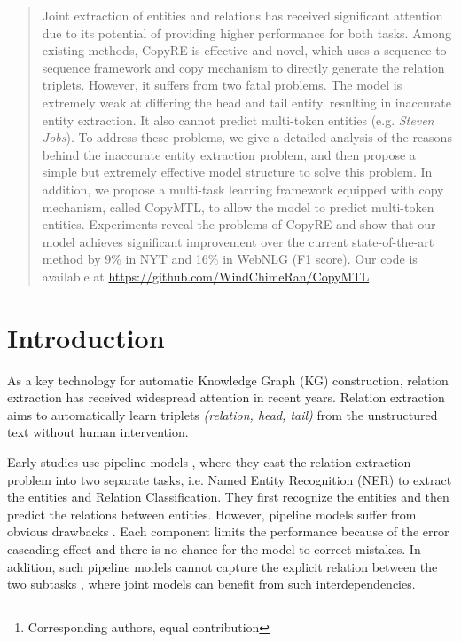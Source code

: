 \documentclass[letterpaper]{article} \usepackage{aaai20}  \usepackage{times}  \usepackage{helvet} \usepackage{courier}  \usepackage[hyphens]{url}  \usepackage{graphicx}
\author{Daojian Zeng\thanks{Corresponding authors, equal contribution}\textsuperscript{\rm }, Ranran Haoran Zhang\footnotemark[1]\textsuperscript{\rm } , \Large Qianying Liu\textsuperscript{\rm }\\ \textsuperscript{\rm }Changsha University of Science \& Technology, Changsha, 410114, China\\ \textsuperscript{\rm }University of Illinois at Urbana-Champaign, Illinois, 61820, USA\\ \textsuperscript{\rm }Kyoto University, Kyoto, 606-8501, Japan\\
	\url{zengdj916@163.com}, \ \url{haoranz6@illinois.edu}, \ \url{ying@nlp.ist.i.kyoto-u.ac.jp}
}
\begin{document}
\maketitle

\begin{abstract}
Joint extraction of entities and relations has received significant attention due to its potential of providing higher performance for both tasks. Among existing methods, 
CopyRE is effective and novel, which uses a sequence-to-sequence framework and copy mechanism to directly generate the relation triplets.
However, it suffers from two fatal problems. The model is extremely weak at differing the head and tail entity, resulting in inaccurate entity extraction. It also cannot predict multi-token entities (e.g. \textit{Steven Jobs}). To address these problems, we give a detailed analysis of the reasons behind the inaccurate entity extraction problem, and then propose a simple but extremely effective model structure to solve this problem. In addition, we propose a multi-task learning framework equipped with copy mechanism, called CopyMTL, to allow the model to predict multi-token entities. Experiments reveal the problems of CopyRE and show that our model achieves significant improvement over the current state-of-the-art method by 9\% in NYT and 16\% in WebNLG (F1 score). Our code is available at \url{https://github.com/WindChimeRan/CopyMTL}

\end{abstract}

  \section{Introduction}
  \label{sec:intro}




  As a key technology for automatic Knowledge Graph (KG) construction, relation extraction has received widespread attention in recent years. Relation extraction aims to automatically learn triplets \textit{(relation, head, tail)} from the unstructured text without human intervention.

  Early studies use pipeline models \cite{pipeline1,pipeline2}, where they cast the relation extraction problem into two separate tasks, i.e. Named Entity Recognition (NER) to extract the entities and Relation Classification. 
  They first recognize the entities and then predict the relations between entities.
  However, pipeline models suffer from obvious drawbacks \cite{linear_programming}. Each component limits the performance because of the error cascading effect and there is no chance for the model to correct mistakes. In addition, such pipeline models cannot capture the explicit relation between the two subtasks \cite{interaction}, where joint models can benefit from such interdependencies.
  
\end{document}
